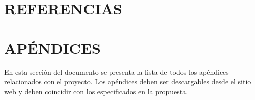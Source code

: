 \documentclass[11pt,oneside,letterpaper]{report}
\begin{document}


\newpage

\thispagestyle{empty}
\mbox{}
\newpage


\newpage


\newpage


\newpage


\newpage

\renewcommand{\contentsname}{CONTENIDO}
\tableofcontents
\newpage



\clearpage
\pagestyle{fancy}










\chapter*{REFERENCIAS}
\printbibliography[heading=none]

\chapter*{APÉNDICES}

En esta sección del documento se presenta la lista de todos los apéndices relacionados con el proyecto. Los apéndices deben ser descargables desde el sitio web y deben coincidir con los especificados en la propuesta.
\end{document}
